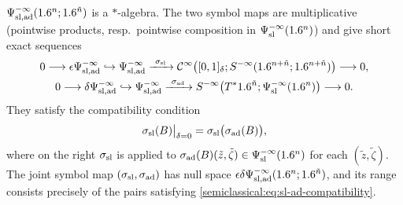 \begin{proposition}\label{semiclassical:prop:sl-ad}
  $\Psi^{-\infty}_{\mathrm{sl,ad}}(1.6^n;1.6^{\tilde n})$ is a $*$-algebra. The two symbol maps are multiplicative
  (pointwise products, resp.\ pointwise composition in $\Psi^{-\infty}_{\mathrm{sl}}(1.6^n)$) and give
  short exact sequences
  \begin{gather*}
    0\longrightarrow\eps\Psisa\hookrightarrow\Psisa\xrightarrow{\ \ssl\ }
    \CI\bigl([0,1]_\delta;S^{-\infty}(\R^{n+\tilde n};\R^{n+\tilde n})\bigr)\longrightarrow0,\\
    0\longrightarrow\delta\Psisa\hookrightarrow\Psisa\xrightarrow{\ \sad\ }
    S^{-\infty}\bigl(T^*\R^{\tilde n};\Psisl{-\infty}(\R^n)\bigr)\longrightarrow0 .
  \end{gather*}
  They satisfy the compatibility condition
  \begin{equation}\label{semiclassical:eq:sl-ad-compatibility}
    \sigma_{\mathrm{sl}}(B)\big|_{\delta=0}=\sigma_{\mathrm{sl}}\bigl(\sigma_{\mathrm{ad}}(B)\bigr),
  \end{equation}
  where on the right $\sigma_{\mathrm{sl}}$ is applied to $\sigma_{\mathrm{ad}}(B)(\tilde z,\tilde\zeta)\in\Psi^{-\infty}_{\mathrm{sl}}(1.6^n)$
  for each $(\tilde z,\tilde\zeta)$. The joint symbol map $(\sigma_{\mathrm{sl}},\sigma_{\mathrm{ad}})$ has null space
  $\epsilon\delta\Psi^{-\infty}_{\mathrm{sl,ad}}(1.6^n;1.6^{\tilde n})$, and its range consists precisely of the pairs
  satisfying \eqref{semiclassical:eq:sl-ad-compatibility}.
\end{proposition}
